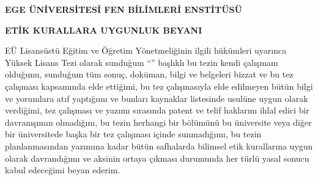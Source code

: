 \clearpage
\thispagestyle{empty}
\setcounter{page}{5}
\begin{center}\textbf{EGE ÜNİVERSİTESİ FEN BİLİMLERİ ENSTİTÜSÜ}\end{center}
\begin{center}\textbf{ETİK KURALLARA UYGUNLUK BEYANI}\end{center}

\indent EÜ Lisansüstü Eğitim ve Öğretim Yönetmeliğinin ilgili hükümleri uyarınca Yüksek Lisans Tezi olarak sunduğum “\tezadi” başlıklı bu tezin kendi çalışmam olduğunu, sunduğum tüm sonuç, doküman, bilgi ve belgeleri bizzat ve bu tez çalışması kapsamında elde ettiğimi, bu tez çalışmasıyla elde edilmeyen bütün bilgi ve yorumlara atıf yaptığımı ve bunları kaynaklar listesinde usulüne uygun olarak verdiğimi, tez çalışması ve yazımı sırasında patent ve telif haklarını ihlal edici bir davranışımın olmadığını, bu tezin herhangi bir bölümünü bu üniversite veya diğer bir üniversitede başka bir tez çalışması içinde sunmadığımı, bu tezin planlanmasından yazımına kadar bütün safhalarda bilimsel etik kurallarına uygun olarak davrandığımı ve aksinin ortaya çıkması durumunda her türlü yasal sonucu kabul edeceğimi beyan ederim.\\
\\
\\
\indent\indent\indent\indent\indent\indent\indent\indent\indent\indent\indent\quad{}\\ \\
\vspace{.9cm}
\indent\indent\indent\indent\indent\indent\indent\indent\indent\indent\indent\quad{}\\
\vspace{.3cm}
\indent\indent\indent\indent\indent\indent\indent\indent\indent\indent\indent\quad{}

\bossayfa
